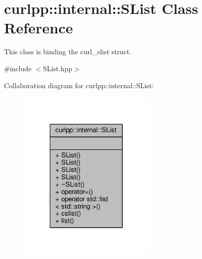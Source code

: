 \hypertarget{classcurlpp_1_1internal_1_1SList}{\section{curlpp\-:\-:internal\-:\-:S\-List Class Reference}
\label{classcurlpp_1_1internal_1_1SList}
}


This class is binding the curl\-\_\-slist struct.  




{\ttfamily \#include $<$S\-List.\-hpp$>$}



Collaboration diagram for curlpp\-:\-:internal\-:\-:S\-List\-:\nopagebreak
\begin{figure}[H]
\begin{center}
\leavevmode
\includegraphics[width=188pt]{classcurlpp_1_1internal_1_1SList__coll__graph}
\end{center}
\end{figure}
